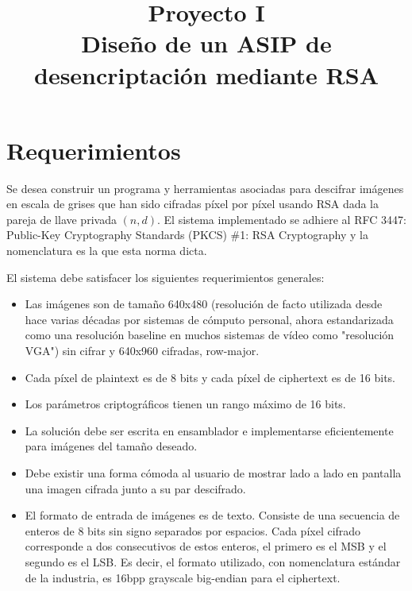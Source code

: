 \documentclass[conference, 14pt]{IEEEtran}
\begin{document}
\makeatletter
\newcommand{\linebreakand}{%
  \end{@IEEEauthorhalign}
  \hfill\mbox{}\par
  \mbox{}\hfill\begin{@IEEEauthorhalign}
}

\title{Proyecto I\\%
	\LARGE{Diseño de un ASIP de desencriptación mediante RSA}}

\author{
	}

\maketitle

\pagestyle{plain}
\thispagestyle{plain}

\section{Requerimientos}

Se desea construir un programa y herramientas asociadas para descifrar imágenes
	  en escala de grises que han sido cifradas píxel por píxel usando RSA dada
	  la pareja de llave privada $(n, d)$. El sistema implementado se adhiere
	  al RFC 3447: Public-Key Cryptography Standards (PKCS) \#1: RSA
	  Cryptography y la nomenclatura es la que esta norma dicta.

El sistema debe satisfacer los siguientes requerimientos generales:
\begin{itemize}

	\item Las imágenes son de tamaño 640x480 (resolución de facto utilizada
		desde hace varias décadas por sistemas de cómputo personal, ahora
		estandarizada como una resolución baseline en muchos sistemas de vídeo
		como "resolución VGA") sin cifrar y 640x960 cifradas, row-major.
	\item Cada píxel de plaintext es de 8 bits y cada píxel de ciphertext es de 16 bits.
	\item Los parámetros criptográficos tienen un rango máximo de 16 bits.
	\item La solución debe ser escrita en ensamblador e implementarse eficientemente
		para imágenes del tamaño deseado.
	\item Debe existir una forma cómoda al usuario de mostrar lado a lado en pantalla
		una imagen cifrada junto a su par descifrado.
	\item El formato de entrada de imágenes es de texto. Consiste de una
		secuencia de enteros de 8 bits sin signo separados por espacios. Cada
		píxel cifrado corresponde a dos consecutivos de estos enteros, el
		primero es el MSB y el segundo es el LSB. Es decir, el formato
		utilizado, con nomenclatura estándar de la industria, es 16bpp grayscale
		big-endian para el ciphertext.

\end{itemize}
\end{document}
